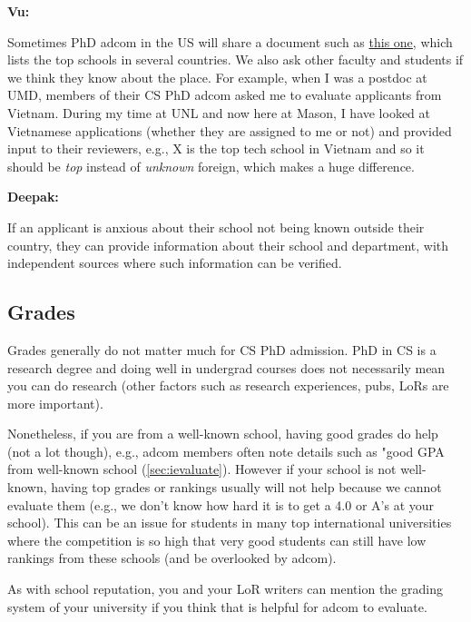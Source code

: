 \documentclass[oneside,11pt,dvipsnames]{book}
\newenvironment{commentbox}[1][]{
  \small
  \begin{mybox}
    {\small \textbf{#1}}
  }{
  \end{mybox}
}
\begin{document}
\begin{commentbox}[Vu:]
  Sometimes PhD adcom in the US will share a document such as \href{https://github.com/dynaroars/dynaroars.github.io/wiki/Foreign-Top-Schools}{this one}, which lists the top schools in several countries. We also ask other faculty and students if we think they know about the place.  For example, when I was a postdoc at UMD, members of their CS PhD adcom asked me to evaluate applicants from Vietnam.  During my time at UNL and now here at Mason, I have looked at Vietnamese applications (whether they are assigned to me or not) and provided input to their reviewers, e.g., X is the top tech school in Vietnam and so it should be \emph{top} instead of \emph{unknown} foreign, which makes a huge difference.
\end{commentbox}
\begin{commentbox}[Deepak:]
  If an applicant is anxious about their school not being known outside their country, they can provide information about their school and department, with independent sources where such information can be verified.
\end{commentbox}

\subsection{Grades} Grades generally do not matter much for CS PhD admission. PhD in CS is a research degree and doing well in undergrad courses does not necessarily mean you can do research (other factors such as research experiences, pubs, LoRs are more important).

Nonetheless, if you are from a well-known school, having good grades do help (not a lot though), e.g., adcom members often note details such as "good GPA from well-known school (\autoref{sec:ievaluate}). However if your school is not well-known, having top grades or rankings usually will not help because we cannot evaluate them (e.g., we don't know how hard it is to get a 4.0 or A's at your school). This can be an issue for students in many top international universities where the competition is so high that very good students can still have low rankings from these schools (and be overlooked by adcom).

As with school reputation, you and your LoR writers can mention the grading system of your university if you think that is helpful for adcom to evaluate.
\end{document}
